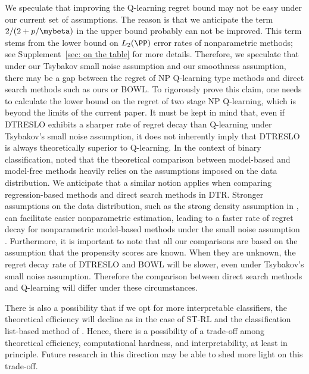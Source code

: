 \documentclass[preprint] {imsart}
\begin{document}
 We speculate that improving the Q-learning regret bound
     may not be  easy under our current set of assumptions. The reason is that we anticipate  the term $2/(2+p/\mybeta)$ in the upper bound  probably can not be improved. This term stems from the lower bound on $L_2(\PP)$ error rates of nonparametric methods; see Supplement~\ref{sec: on the table} for more details. Therefore, we speculate that under our Tsybakov small noise assumption and our smoothness assumption, there may be a gap between the regret of NP Q-learning type methods and direct search methods such as ours or BOWL. To rigorously prove this claim, one needs to calculate the lower bound on the regret of two stage NP Q-learning, which is beyond the limits of the current paper. It must be kept in mind that, even if DTRESLO exhibits a sharper rate of regret decay than Q-learning under Tsybakov's small noise assumption,
     it does not inherently imply that DTRESLO is always theoretically superior to Q-learning. In the context of binary classification, \cite{audibert2007} noted that the theoretical comparison between model-based and model-free methods heavily relies on the assumptions imposed on the data distribution.  We anticipate that a similar notion applies when comparing regression-based methods and direct search methods in DTR. Stronger assumptions on the data distribution, such as the strong density assumption in \cite{audibert2004}, can facilitate easier nonparametric estimation, leading to a faster rate of regret decay for nonparametric model-based methods under the small noise assumption \citep{luedtke2016, qian2011}. {\color{black} \label{page: propensity scores} Furthermore, it is important to note that all our comparisons are based on the assumption that the propensity scores are known. When they are unknown, the regret decay rate of DTRESLO and BOWL will be slower, even under Tsybakov's small noise assumption. Therefore the comparison between direct search methods and Q-learning will differ under these circumstances.}

     
     There is also a possibility that if we opt for more interpretable classifiers, the theoretical efficiency will decline as in the case of  ST-RL and the classification list-based method of \cite{zhang2018interpretable}. Hence, there is a possibility of a trade-off among theoretical efficiency, computational hardness, and interpretability, at least in principle. Future research in this direction may be able to shed more light on this trade-off.
     
     
\end{document}
